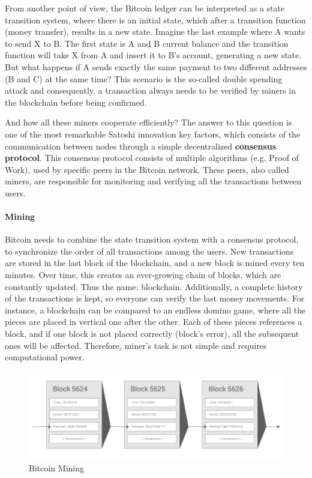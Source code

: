 From another point of view, the Bitcoin ledger can be interpreted as a state transition system, where there is an initial state, which after a transition function (money transfer), results in a new state. Imagine the last example where A wants to send X to B. The first state is A and B current balance and the transition function will take X from A and insert it to B's account, generating a new state. But what happens if A sends exactly the same payment to two different addresses (B and C) at the same time? This scenario is the so-called double spending attack and consequently, a transaction always needs to be verified by miners in the blockchain before being confirmed.

And how all these miners cooperate efficiently? The answer to this question is one of the most remarkable Satoshi innovation key factors, which consists of the communication between nodes through a simple decentralized \textbf{ consensus protocol}. This consensus protocol consists of multiple algorithms (e.g. Proof of Work), used by specific peers in the Bitcoin network. These peers, also called miners, are responsible for monitoring and verifying all the transactions between users.

\paragraph{Mining}

Bitcoin needs to combine the state transition system with a consensus protocol, to synchronize the order of all transactions among the users.
New transactions are stored in the last block of the blockchain, and a new block is mined every ten minutes. Over time, this creates an ever-growing chain of blocks, which are constantly updated. Thus the name: blockchain. Additionally, a complete history of the transactions is kept, so everyone can verify the last money movements. For instance, a blockchain can be compared to an endless domino game, where all the pieces are placed in vertical one after the other. Each of these pieces references a block, and if one block is not placed correctly (block's error), all the subsequent ones will be affected. Therefore, miner's task is not simple and requires computational power.

\begin{figure}
  \centering
  	\includegraphics[scale=0.4]{gfx/mining.png}
  \caption{Bitcoin Mining}
  \label{fig:Bitcoin mining}
\end{figure}

